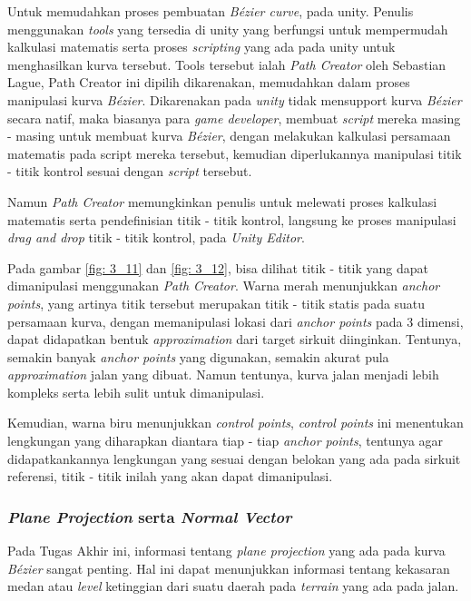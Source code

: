 	    Untuk memudahkan proses pembuatan \textit{Bézier curve}, pada unity. Penulis menggunakan \textit{tools} yang tersedia di unity yang berfungsi untuk mempermudah kalkulasi matematis serta proses \textit{scripting} yang ada pada unity untuk menghasilkan kurva tersebut. Tools tersebut ialah \textit{Path Creator} oleh Sebastian Lague, Path Creator ini dipilih dikarenakan, memudahkan dalam proses manipulasi kurva \textit{Bézier}. Dikarenakan pada \textit{unity} tidak mensupport kurva \textit{Bézier} secara natif, maka biasanya para \textit{game developer}, membuat \textit{script} mereka masing - masing untuk membuat kurva \textit{Bézier}, dengan melakukan kalkulasi persamaan matematis pada script mereka tersebut, kemudian diperlukannya manipulasi titik - titik kontrol sesuai dengan \textit{script} tersebut.
	    \par Namun \textit{Path Creator} memungkinkan penulis untuk melewati proses kalkulasi matematis serta pendefinisian titik - titik kontrol, langsung ke proses manipulasi \textit{drag and drop} titik - titik kontrol, pada \textit{Unity Editor}.
	    \par Pada gambar \ref{fig: 3_11} dan \ref{fig: 3_12}, bisa dilihat titik - titik yang dapat dimanipulasi menggunakan \textit{Path Creator}. Warna merah menunjukkan \textit{anchor points}, yang artinya titik tersebut merupakan titik - titik statis pada suatu persamaan kurva, dengan memanipulasi lokasi dari \textit{anchor points} pada 3 dimensi, dapat didapatkan bentuk \textit{approximation} dari target sirkuit diinginkan. Tentunya, semakin banyak \textit{anchor points} yang digunakan, semakin akurat pula \textit{approximation} jalan yang dibuat. Namun tentunya, kurva jalan menjadi lebih kompleks serta lebih sulit untuk dimanipulasi.
	    \par Kemudian, warna biru menunjukkan \textit{control points}, \textit{control points} ini menentukan lengkungan yang diharapkan diantara tiap - tiap \textit{anchor points}, tentunya agar didapatkankannya lengkungan yang sesuai dengan belokan yang ada pada sirkuit referensi, titik - titik inilah yang akan dapat dimanipulasi.
	    
	    \subsubsection{\textit{Plane Projection} serta \textit{Normal Vector}}
        
        Pada Tugas Akhir ini, informasi tentang \textit{plane projection} yang ada pada kurva \textit{Bézier} sangat penting. Hal ini dapat menunjukkan informasi tentang kekasaran medan atau \textit{level} ketinggian dari suatu daerah pada \textit{terrain} yang ada pada jalan.
        
